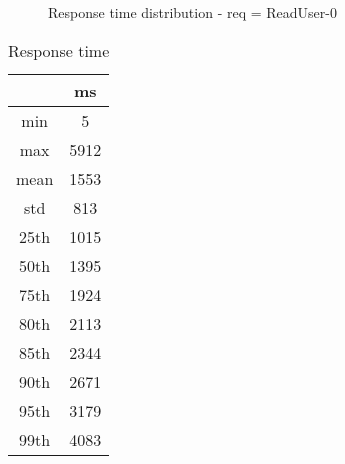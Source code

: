 \begin{minipage}{0.75\linewidth}
\begin{figure}[h]
\begin{adjustbox}{max width=1.0\linewidth, keepaspectratio}
  \end{adjustbox}
  \caption{Response time distribution - req = ReadUser-0}
\end{figure}
\end{minipage}\hfill\begin{minipage}{0.18\linewidth}
\begin{table}[h]
\begin{tabular}{|cc|}
\hline
\textbf{} & \textbf{ms}\\ \hline
 \Xhline{0.005\arrayrulewidth}
min & 5\\
 \Xhline{0.005\arrayrulewidth}
max & 5912\\
 \Xhline{0.005\arrayrulewidth}
mean & 1553\\
 \Xhline{0.005\arrayrulewidth}
std & 813\\
\hline
\hline
 \Xhline{0.005\arrayrulewidth}
25th & 1015\\
 \Xhline{0.005\arrayrulewidth}
50th & 1395\\
 \Xhline{0.005\arrayrulewidth}
75th & 1924\\
 \Xhline{0.005\arrayrulewidth}
80th & 2113\\
 \Xhline{0.005\arrayrulewidth}
85th & 2344\\
 \Xhline{0.005\arrayrulewidth}
90th & 2671\\
 \Xhline{0.005\arrayrulewidth}
95th & 3179\\
 \Xhline{0.005\arrayrulewidth}
99th & 4083\\
\hline
\end{tabular}
\caption{Response time}
\end{table}
\end{minipage}\hfill